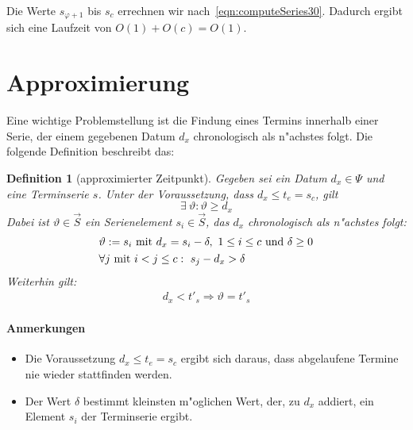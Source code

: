 \documentclass[a4paper]{article}
\numberwithin{equation}{section}
\newtheorem{dfn}{Definition}
\begin{document}
\noindent Die Werte $s_{\varphi + 1}$ bis $s_c$ errechnen wir
nach~\eqref{eqn:computeSeries30}. Dadurch ergibt sich eine Laufzeit von
$O(1) + O(c) = O(1)$.



%
%
%
%
\section{Approximierung}
Eine wichtige Problemstellung ist die Findung eines Termins innerhalb einer
Serie, der einem gegebenen Datum $d_x$ chronologisch als n"achstes folgt. Die
folgende Definition beschreibt das:
\begin{dfn}[approximierter Zeitpunkt]\label{def:approx}
  Gegeben sei ein Datum $d_x \in \Psi$ und eine Terminserie $s$. Unter der
  Voraussetzung, dass $d_x \le t_e = s_c$, gilt
  \begin{equation}\exists\ \vartheta : \vartheta \ge d_x\end{equation}
  Dabei ist $\vartheta \in \vec{S}$ ein Serienelement $s_i \in \vec{S}$, das
  $d_x$ chronologisch als n"achstes folgt:
  \begin{equation}\label{eqn:approxGeneral}
  \begin{split}
    & \vartheta := s_i \textnormal{ mit } d_x = s_i - \delta,\ 1 \le i \le c
      \textnormal{ und } \delta \ge 0 \\
    & \forall j \textnormal{ mit } i < j \le c :\ s_j - d_x > \delta
  \end{split}
  \end{equation}
  Weiterhin gilt:
  \begin{eqnarray}\label{eqn:approxEasy}
    d_x < t'_s \Longrightarrow \vartheta = t'_s
  \end{eqnarray}
\end{dfn}

\paragraph{Anmerkungen}
\begin{itemize}
  \item Die Voraussetzung $d_x \le t_e = s_c$ ergibt sich daraus, dass
    abgelaufene Termine nie wieder stattfinden werden.
  \item Der Wert $\delta$ bestimmt kleinsten m"oglichen Wert, der, zu $d_x$
    addiert, ein Element $s_i$ der Terminserie ergibt.
\end{itemize}
\end{document}
